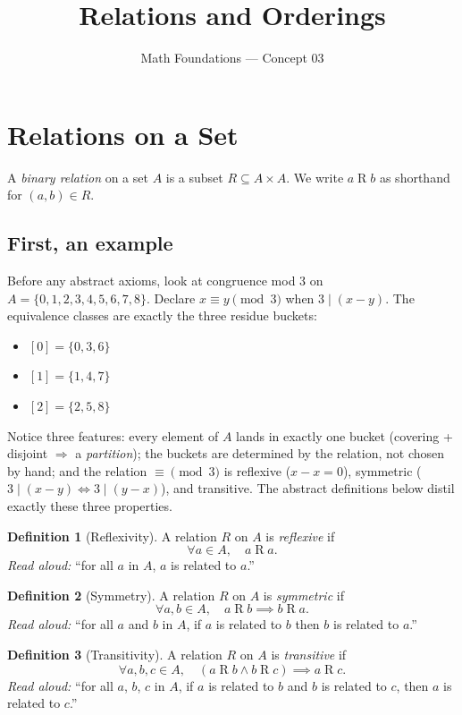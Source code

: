 \documentclass[11pt]{article}
\title{Relations and Orderings}
\author{Math Foundations --- Concept 03}
\date{}
\theoremstyle{definition}
\newtheorem{definition}{Definition}
\begin{document}
\maketitle

\section{Relations on a Set}

A \emph{binary relation} on a set $A$ is a subset $R \subseteq A \times A$.
We write $a \mathrel{R} b$ as shorthand for $(a,b) \in R$.

\subsection*{First, an example}
Before any abstract axioms, look at congruence mod $3$ on $A = \{0,1,2,3,4,5,6,7,8\}$. Declare $x \equiv y \pmod 3$ when $3 \mid (x-y)$. The equivalence classes are exactly the three residue buckets:
\begin{itemize}[leftmargin=2em]
  \item $[0] = \{0, 3, 6\}$
  \item $[1] = \{1, 4, 7\}$
  \item $[2] = \{2, 5, 8\}$
\end{itemize}
Notice three features: every element of $A$ lands in exactly one bucket (covering + disjoint $\Rightarrow$ a \emph{partition}); the buckets are determined by the relation, not chosen by hand; and the relation $\equiv \pmod 3$ is reflexive ($x - x = 0$), symmetric ($3 \mid (x-y) \Leftrightarrow 3 \mid (y-x)$), and transitive. The abstract definitions below distil exactly these three properties.

\begin{definition}[Reflexivity]
A relation $R$ on $A$ is \emph{reflexive} if
\[ \forall a \in A,\quad a \mathrel{R} a. \]
\emph{Read aloud:} ``for all $a$ in $A$, $a$ is related to $a$.''
\end{definition}

\begin{definition}[Symmetry]
A relation $R$ on $A$ is \emph{symmetric} if
\[ \forall a, b \in A,\quad a \mathrel{R} b \implies b \mathrel{R} a. \]
\emph{Read aloud:} ``for all $a$ and $b$ in $A$, if $a$ is related to $b$ then $b$ is related to $a$.''
\end{definition}

\begin{definition}[Transitivity]
A relation $R$ on $A$ is \emph{transitive} if
\[ \forall a, b, c \in A,\quad (a \mathrel{R} b \wedge b \mathrel{R} c) \implies a \mathrel{R} c. \]
\emph{Read aloud:} ``for all $a$, $b$, $c$ in $A$, if $a$ is related to $b$ and $b$ is related to $c$, then $a$ is related to $c$.''
\end{definition}
\end{document}

